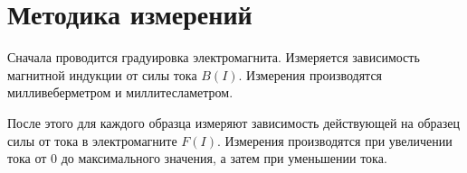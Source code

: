 \section*{Методика измерений}

Сначала проводится градуировка электромагнита. Измеряется зависимость магнитной индукции от силы тока $B(I)$. Измерения производятся милливеберметром и миллитесламетром.

После этого для каждого образца измеряют зависимость действующей на образец силы от тока в электромагните $F(I)$. Измерения производятся при увеличении тока от 0 до максимального значения, а затем при уменьшении тока.